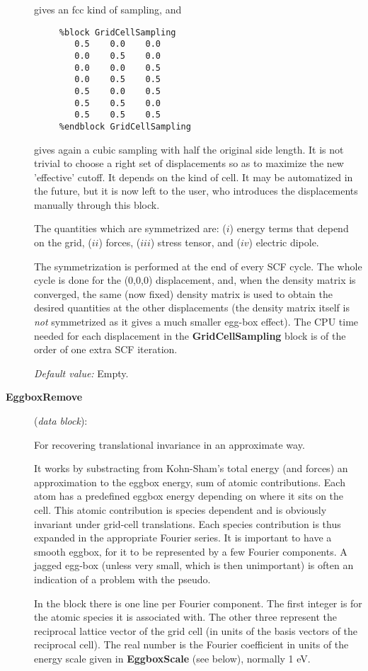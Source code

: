 \documentclass[11pt]{article}
\begin{document}
\begin{description}
gives an fcc kind of sampling, and

\begin{verbatim}
     %block GridCellSampling
        0.5    0.0    0.0
        0.0    0.5    0.0
        0.0    0.0    0.5
        0.0    0.5    0.5
        0.5    0.0    0.5
        0.5    0.5    0.0
        0.5    0.5    0.5
     %endblock GridCellSampling
\end{verbatim}

gives again a cubic sampling with half the original side length.
It is not trivial to choose a right set of displacements so as
to maximize the new 'effective' cutoff. It depends on the 
kind of cell. It may be automatized in the future, but it 
is now left to the user, who introduces the displacements
manually through this block.

The quantities which are symmetrized are: ($i$) energy terms
that depend on the grid, ($ii$) forces, ($iii$) stress
tensor, and ($iv$) electric dipole.

The symmetrization is performed at the end of every SCF cycle. The 
whole cycle is done for the (0,0,0) displacement, and, when the
density matrix is converged, the same (now fixed)
density matrix is used to obtain the desired quantities at the 
other displacements (the density matrix itself is {\it not}
symmetrized as it gives a much smaller egg-box effect).
The CPU time needed for each displacement
in the {\bf GridCellSampling} block
is of the order of one extra SCF iteration.

{\it Default value:} Empty.


\item[{\bf EggboxRemove}] ({\it data block}):

For recovering translational invariance in an approximate way.

It works by substracting from Kohn-Sham's total energy (and forces) an
approximation to the eggbox energy, sum of atomic contributions. 
Each atom has a predefined eggbox energy depending on where it sits on
the cell. This atomic contribution is species dependent and is 
obviously invariant under grid-cell translations. Each species
contribution is thus expanded in the appropriate Fourier series.
It is important to have a smooth eggbox, for it to  
be represented by a few Fourier components. A jagged egg-box (unless
very small, which is then unimportant) is often an
indication of a problem with the pseudo.

In the block there is one line per Fourier component. The first integer
is for the atomic species it is associated with. The other three
represent the reciprocal lattice vector of the grid cell (in units
of the basis vectors of the reciprocal cell). The real number is
the Fourier coefficient in units of the energy scale given in 
{\bf EggboxScale} (see below), normally 1 eV.


\end{description}
\end{document}
